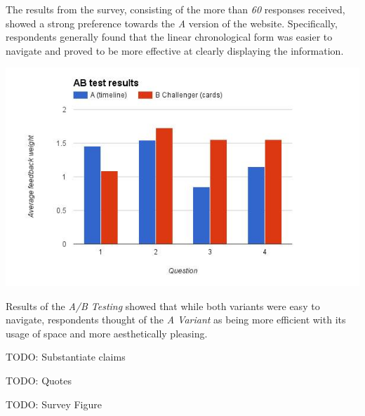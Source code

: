 \documentclass[a4paper, notoc]{tufte-handout}
\begin{document}
The results from the survey, consisting of the more than \emph{60} responses received, showed 
a strong preference towards the \textit{A} version of the website. Specifically, respondents 
generally found that the linear chronological form was easier to navigate and proved to be more 
effective at clearly displaying the information.

\begin{marginfigure}
  \includegraphics[width=\linewidth]{abresults.png}
  \caption{
    \label{fig:abresults}
    Results of the \textit{A/B Testing} showed that while both variants were easy to navigate, 
    respondents thought of the \textit{A Variant} as being more efficient with its usage of space 
    and more aesthetically pleasing.
  }
\end{marginfigure}

TODO: Substantiate claims

TODO: Quotes

TODO: Survey Figure
\end{document}
